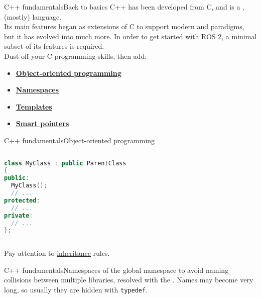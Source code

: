 \begin{frame}{C++ fundamentals}{Back to basics}
	C++ has been developed from C, and is a ,  (mostly) language.\\
	Its main features began as extensions of C to support modern  and  paradigms, but it has evolved into much more.
	\newline\newline
	In order to get started with ROS 2, a minimal subset of its features is required.\\
	Dust off your C programming skills, then add:
	\begin{itemize}
		\item \href{https://www.geeksforgeeks.org/c-classes-and-objects/}{\color{blue}\underline{\textbf{Object-oriented programming}}}
		\item \href{https://www.geeksforgeeks.org/namespace-in-c/}{\color{blue}\underline{\textbf{Namespaces}}}
		\item \href{https://www.geeksforgeeks.org/templates-cpp/}{\color{blue}\underline{\textbf{Templates}}}
		\item \href{https://www.geeksforgeeks.org/smart-pointers-cpp/}{\color{blue}\underline{\textbf{Smart pointers}}}
	\end{itemize}
\end{frame}
\begin{frame}[fragile]{C++ fundamentals}{Object-oriented programming}
	\begin{columns}
		\begin{lstlisting}[language=C++, caption=Example of definition of a C++ class.]
class MyClass : public ParentClass
{
public:
  MyClass();
  // ...
protected:
  // ...
private:
  // ...
};\end{lstlisting}
	\end{columns}
	Pay attention to \href{https://www.geeksforgeeks.org/inheritance-in-c/}{\color{blue}\underline{inheritance}} rules.
\end{frame}
\begin{frame}{C++ fundamentals}{Namespaces}
   of the global namespace to avoid naming collisions between multiple libraries, resolved with the .
  \newline\newline
  Names may become very long, so usually they are hidden with \texttt{typedef}.
\end{frame}
